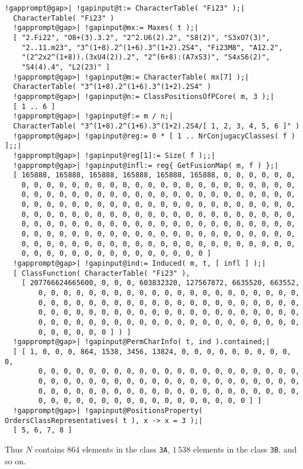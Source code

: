 \documentclass[a4paper,11pt]{report}
\begin{document}
{{{ 
\begin{Verbatim}[commandchars=!@|,fontsize=\small,frame=single,label=Example]
  !gapprompt@gap>| !gapinput@t:= CharacterTable( "Fi23" );|
  CharacterTable( "Fi23" )
  !gapprompt@gap>| !gapinput@mx:= Maxes( t );|
  [ "2.Fi22", "O8+(3).3.2", "2^2.U6(2).2", "S8(2)", "S3xO7(3)", 
    "2..11.m23", "3^(1+8).2^(1+6).3^(1+2).2S4", "Fi23M8", "A12.2", 
    "(2^2x2^(1+8)).(3xU4(2)).2", "2^(6+8):(A7xS3)", "S4xS6(2)", 
    "S4(4).4", "L2(23)" ]
  !gapprompt@gap>| !gapinput@m:= CharacterTable( mx[7] );|
  CharacterTable( "3^(1+8).2^(1+6).3^(1+2).2S4" )
  !gapprompt@gap>| !gapinput@n:= ClassPositionsOfPCore( m, 3 );|
  [ 1 .. 6 ]
  !gapprompt@gap>| !gapinput@f:= m / n;|
  CharacterTable( "3^(1+8).2^(1+6).3^(1+2).2S4/[ 1, 2, 3, 4, 5, 6 ]" )
  !gapprompt@gap>| !gapinput@reg:= 0 * [ 1 .. NrConjugacyClasses( f ) ];;|
  !gapprompt@gap>| !gapinput@reg[1]:= Size( f );;|
  !gapprompt@gap>| !gapinput@infl:= reg{ GetFusionMap( m, f ) };|
  [ 165888, 165888, 165888, 165888, 165888, 165888, 0, 0, 0, 0, 0, 0, 
    0, 0, 0, 0, 0, 0, 0, 0, 0, 0, 0, 0, 0, 0, 0, 0, 0, 0, 0, 0, 0, 0, 
    0, 0, 0, 0, 0, 0, 0, 0, 0, 0, 0, 0, 0, 0, 0, 0, 0, 0, 0, 0, 0, 0, 
    0, 0, 0, 0, 0, 0, 0, 0, 0, 0, 0, 0, 0, 0, 0, 0, 0, 0, 0, 0, 0, 0, 
    0, 0, 0, 0, 0, 0, 0, 0, 0, 0, 0, 0, 0, 0, 0, 0, 0, 0, 0, 0, 0, 0, 
    0, 0, 0, 0, 0, 0, 0, 0, 0, 0, 0, 0, 0, 0, 0, 0, 0, 0, 0, 0, 0, 0, 
    0, 0, 0, 0, 0, 0, 0, 0, 0, 0, 0, 0, 0, 0, 0, 0, 0, 0, 0, 0, 0, 0, 
    0, 0, 0, 0, 0, 0, 0, 0, 0, 0, 0, 0, 0, 0, 0, 0, 0, 0, 0, 0, 0, 0, 
    0, 0, 0, 0, 0, 0, 0, 0, 0, 0, 0, 0, 0, 0, 0 ]
  !gapprompt@gap>| !gapinput@ind:= Induced( m, t, [ infl ] );|
  [ ClassFunction( CharacterTable( "Fi23" ),
    [ 207766624665600, 0, 0, 0, 603832320, 127567872, 6635520, 663552, 
        0, 0, 0, 0, 0, 0, 0, 0, 0, 0, 0, 0, 0, 0, 0, 0, 0, 0, 0, 0, 0, 
        0, 0, 0, 0, 0, 0, 0, 0, 0, 0, 0, 0, 0, 0, 0, 0, 0, 0, 0, 0, 0, 
        0, 0, 0, 0, 0, 0, 0, 0, 0, 0, 0, 0, 0, 0, 0, 0, 0, 0, 0, 0, 0, 
        0, 0, 0, 0, 0, 0, 0, 0, 0, 0, 0, 0, 0, 0, 0, 0, 0, 0, 0, 0, 0, 
        0, 0, 0, 0, 0, 0 ] ) ]
  !gapprompt@gap>| !gapinput@PermCharInfo( t, ind ).contained;|
  [ [ 1, 0, 0, 0, 864, 1538, 3456, 13824, 0, 0, 0, 0, 0, 0, 0, 0, 0, 0, 
        0, 0, 0, 0, 0, 0, 0, 0, 0, 0, 0, 0, 0, 0, 0, 0, 0, 0, 0, 0, 0, 
        0, 0, 0, 0, 0, 0, 0, 0, 0, 0, 0, 0, 0, 0, 0, 0, 0, 0, 0, 0, 0, 
        0, 0, 0, 0, 0, 0, 0, 0, 0, 0, 0, 0, 0, 0, 0, 0, 0, 0, 0, 0, 0, 
        0, 0, 0, 0, 0, 0, 0, 0, 0, 0, 0, 0, 0, 0, 0, 0, 0 ] ]
  !gapprompt@gap>| !gapinput@PositionsProperty( OrdersClassRepresentatives( t ), x -> x = 3 );|
  [ 5, 6, 7, 8 ]
\end{Verbatim}
 Thus $N$ contains $864$ elements in the class \texttt{3A}, $1\,538$ elements in the class \texttt{3B}, and so on. }

}}
\end{document}
